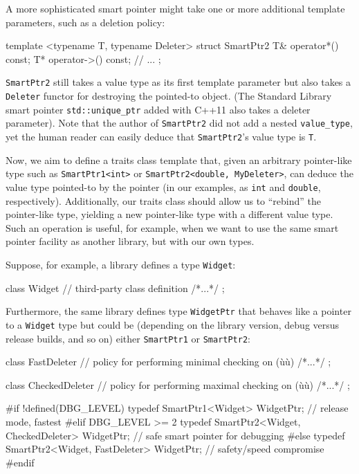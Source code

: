 \noindent A more sophisticated smart pointer might take one or more additional
template parameters, such as a deletion policy:

\begin{emcppslisting}[emcppsbatch=e40]
template <typename T, typename Deleter>
struct SmartPtr2
{
    T& operator*() const;
    T* operator->() const;
    // ...
};
\end{emcppslisting}
    

\noindent \lstinline!SmartPtr2! still takes a value type as its first template
parameter but also takes a \lstinline!Deleter! functor for destroying the
pointed-to object. (The Standard Library smart pointer\linebreak%
\lstinline!std::unique_ptr! added with C++11 also takes a deleter
parameter). Note that the author of \lstinline!SmartPtr2! did not add a
nested \lstinline!value_type!, yet the human reader can easily deduce that
\lstinline!SmartPtr2!'s value type is \lstinline!T!.

Now, we aim to define a traits class template that, given an arbitrary
pointer-like type such as \lstinline!SmartPtr1<int>! or
\lstinline!SmartPtr2<double,!~\lstinline!MyDeleter>!, can deduce the value
type pointed-to by the pointer (in our examples, as \lstinline!int! and
\lstinline!double!, respectively). Additionally, our traits class should
allow us to ``rebind'' the pointer-like type, yielding a new
pointer-like type with a different value type. Such an operation is
useful, for example, when we want to use the same smart pointer facility
as another library, but with our own types.

Suppose, for example, a library defines a type \lstinline!Widget!:

\begin{emcppslisting}[emcppsbatch=e40]
class Widget           // third-party class definition
{ /*...*/ };
\end{emcppslisting}
    

\noindent Furthermore, the same library defines type \lstinline!WidgetPtr! that
behaves like a pointer to a \lstinline!Widget! type but could be (depending
on the library version, debug versus release builds, and so on) either
\lstinline!SmartPtr1! or \lstinline!SmartPtr2!:

\begin{emcppslisting}[emcppsbatch=e40]
class FastDeleter     // policy for performing minimal checking on (ù{}ù)
{ /*...*/ };

class CheckedDeleter        // policy for performing maximal checking on (ù{}ù)
{ /*...*/ };

#if !defined(DBG_LEVEL)
typedef SmartPtr1<Widget>
    WidgetPtr;                             // release mode, fastest
#elif DBG_LEVEL >= 2
typedef SmartPtr2<Widget, CheckedDeleter>
    WidgetPtr;                             // safe smart pointer for debugging
#else
typedef SmartPtr2<Widget, FastDeleter>
    WidgetPtr;                             // safety/speed compromise
#endif
\end{emcppslisting}
    

